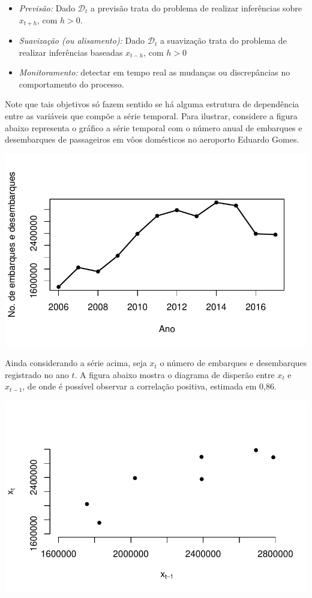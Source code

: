 \documentclass[
  letterpaper,
  DIV=11,
  numbers=noendperiod]{scrartcl}
\theoremstyle{plain}
\theoremstyle{plain}
\theoremstyle{definition}
\theoremstyle{definition}
\theoremstyle{remark}
\begin{document}
\begin{itemize}
\item
  \emph{Previsão:} Dado \(\mathcal{D}_t\) a previsão trata do problema
  de realizar inferências sobre \(x_{t+h}\), com \(h>0\).
\item
  \emph{Suavização (ou alisamento):} Dado \(\mathcal{D}_t\) a suavização
  trata do problema de realizar inferências baseadas \(x_{t-h}\), com
  \(h>0\)
\item
  \emph{Monitoramento:} detectar em tempo real as mudanças ou
  discrepâncias no comportamento do processo.
\end{itemize}

Note que tais objetivos só fazem sentido se há alguma estrutura de
dependência entre as variáveis que compõe a série temporal. Para
ilustrar, considere a figura abaixo representa o gráfico a série
temporal com o número anual de embarques e desembarques de passageiros
em vôos domésticos no aeroporto Eduardo Gomes.

\includegraphics{intro_files/figure-pdf/unnamed-chunk-1-1.pdf}

Ainda considerando a série acima, seja \(x_t\) o número de embarques e
desembarques registrado no ano \(t\). A figura abaixo mostra o diagrama
de disperão entre \(x_t\) e \(x_{t-1}\), de onde é possível observar a
correlação positiva, estimada em 0,86.

\includegraphics{intro_files/figure-pdf/unnamed-chunk-2-1.pdf}
\end{document}

